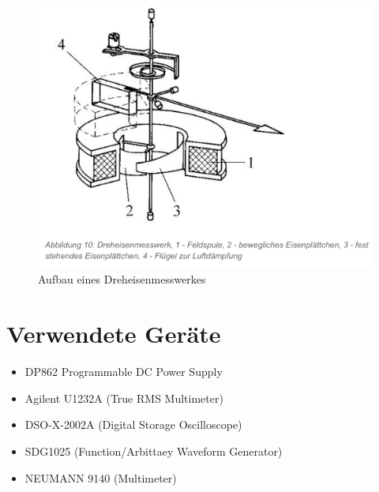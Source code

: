 \documentclass[a4paper,12pt]{article}
\begin{document}
	\begin{figure}[h]
		\centering
		\includegraphics[width=15cm]{img/Dreheisen}
		\caption{Aufbau eines Dreheisenmesswerkes}
	\end{figure}
	
	\newpage
	\section{Verwendete Geräte}
	\begin{itemize}
		\item DP862 Programmable DC Power Supply
		\item Agilent U1232A (True RMS Multimeter)
		\item DSO-X-2002A (Digital Storage Oscilloscope)
		\item SDG1025 (Function/Arbittaey Waveform Generator)
		\item NEUMANN 9140 (Multimeter)
	\end{itemize}
	\newpage
	\listoffigures
	\newpage
	\listoftables
\end{document}
